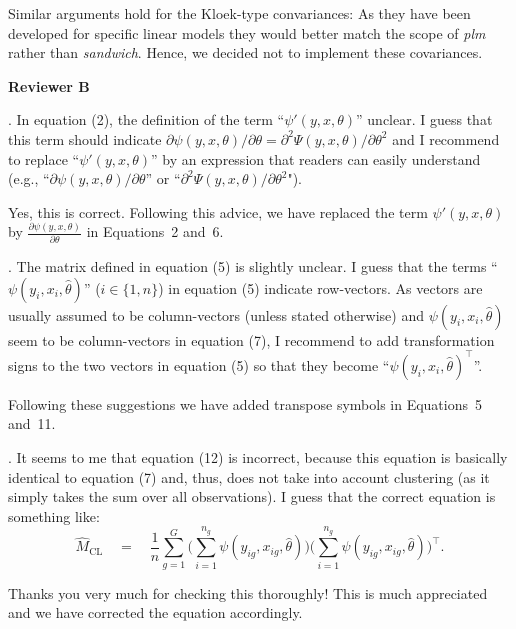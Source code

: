\documentclass[american,foldmarks=false]{uibklttr}
\let\pkg=\emph
\newenvironment{review}{\fontshape{\itdefault}\fontseries{\bfdefault} \selectfont \smallskip}{\par}
\begin{document}
Similar arguments hold for the Kloek-type convariances: As they have been
developed for specific linear models they would better match the scope of
\pkg{plm} rather than \pkg{sandwich}. Hence, we decided not to implement these
covariances.


\newpage


\textbf{\LARGE Reviewer B}

\begin{review}
1. In equation (2), the definition of the term ``$\psi'(y, x,
\theta)$'' unclear. I guess that this term should indicate $\partial \psi(y, x,
\theta)/\partial\theta = \partial^2\Psi(y, x, \theta)/\partial\theta^2$ and I
recommend to replace ``$\psi'(y, x, \theta)$'' by an expression that readers can
easily understand (e.g., ``$\partial \psi(y, x, \theta)/\partial\theta$'' or
``$\partial^2\Psi(y, x, \theta)/\partial\theta^2$").
\end{review}

Yes, this is correct. Following this advice, we have replaced the
term $\psi'(y, x, \theta)$ by $\frac{\partial \psi(y, x,\theta)}{\partial\theta}$
in Equations~2 and~6.


\begin{review}
2. The matrix defined in equation (5) is slightly unclear. I
guess that the terms ``$\psi(y_i, x_i, \hat\theta)$'' ($i \in \{1, n\}$) in
equation (5) indicate row-vectors. As vectors are usually assumed to be
column-vectors (unless stated otherwise) and $\psi(y_i, x_i, \hat\theta)$ seem
to be column-vectors in equation (7), I recommend to add transformation signs to
the two vectors in equation (5) so that they become ``$\psi(y_i, x_i,
\hat\theta)^\top$''.
\end{review}

Following these suggestions we have added transpose symbols in Equations~5
and~11. 


\begin{review}
3. It seems to me that equation (12) is incorrect, because this
equation is basically identical to equation (7) and, thus, does not take into
account clustering (as it simply takes the sum over all observations). I guess
that the correct equation is something like:
\[
\hat M_\mathrm{CL} \quad = \quad \frac{1}{n} \sum_{g = 1}^G\bigg(\sum_{i = 1}^{n_{g}}\psi(y_{ig}, x_{ig}, \hat \theta) \bigg)
  \bigg(\sum_{i = 1}^{n_{g}} \psi(y_{ig}, x_{ig}, \hat \theta) \bigg)^\top.
\]
\end{review}

Thanks you very much for checking this thoroughly! This is much appreciated
and we have corrected the equation accordingly.
\end{document}
